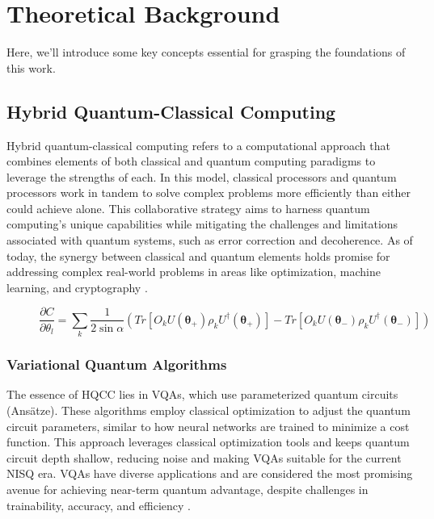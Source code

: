 

\section{Theoretical Background}
\label{sec: backg}

Here, we'll introduce some key concepts essential for grasping the foundations of this work.


\subsection{Hybrid Quantum-Classical Computing}
\label{sec: HQCC}
Hybrid quantum-classical computing refers to a computational approach that combines elements of both classical and quantum computing paradigms to leverage the strengths of each. In this model, classical processors and quantum processors work in tandem to solve complex problems more efficiently than either could achieve alone. This collaborative strategy aims to harness quantum computing's unique capabilities while mitigating the challenges and limitations associated with quantum systems, such as error correction and decoherence. As of today, the synergy between classical and quantum elements holds promise for addressing complex real-world problems in areas like optimization, machine learning, and cryptography \cite{Cerezo_2021}.

\begin{figure}[b]
    \centering
    \begin{equation}\label{eq:param_shift}\tag{4}
        \frac{\partial C}{\partial \theta_l} = \sum_k \frac{1}{2\sin{\alpha}}\left(Tr\left[O_k U(\boldsymbol{\theta_+}) \rho_k U^{\dagger}(\boldsymbol{\theta_+})\right] - Tr\left[O_k U(\boldsymbol{\theta_-}) \rho_k U^{\dagger}(\boldsymbol{\theta_-})\right]\right)
    \end{equation}
\end{figure}

\subsubsection{Variational Quantum Algorithms}
The essence of HQCC lies in VQAs, which use parameterized quantum circuits (Ansätze). These algorithms employ classical optimization to adjust the quantum circuit parameters, similar to how neural networks are trained to minimize a cost function. This approach leverages classical optimization tools and keeps quantum circuit depth shallow, reducing noise and making VQAs suitable for the current NISQ era. VQAs have diverse applications and are considered the most promising avenue for achieving near-term quantum advantage, despite challenges in trainability, accuracy, and efficiency \cite{Cerezo_2021}.

